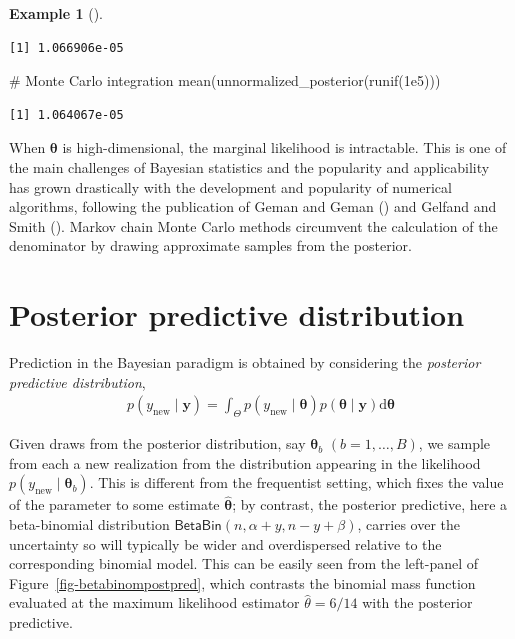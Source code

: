 \documentclass[
  11pt,
  letterpaper,
]{scrbook}
\newenvironment{Shaded}{\begin{snugshade}}{\end{snugshade}}
\newcommand{\CommentTok}[1]{\textcolor[rgb]{0.37,0.37,0.37}{#1}}
\newcommand{\FloatTok}[1]{\textcolor[rgb]{0.68,0.00,0.00}{#1}}
\newcommand{\FunctionTok}[1]{\textcolor[rgb]{0.28,0.35,0.67}{#1}}
\newcommand{\NormalTok}[1]{\textcolor[rgb]{0.00,0.23,0.31}{#1}}
\theoremstyle{definition}
\theoremstyle{definition}
\newtheorem{example}{Example}[chapter]
\theoremstyle{definition}
\theoremstyle{plain}
\theoremstyle{plain}
\theoremstyle{remark}
\begin{document}
\begin{example}[]
\begin{verbatim}
[1] 1.066906e-05
\end{verbatim}

\begin{Shaded}
\begin{Highlighting}[]
\CommentTok{\# Monte Carlo integration}
\FunctionTok{mean}\NormalTok{(}\FunctionTok{unnormalized\_posterior}\NormalTok{(}\FunctionTok{runif}\NormalTok{(}\FloatTok{1e5}\NormalTok{)))}
\end{Highlighting}
\end{Shaded}

\begin{verbatim}
[1] 1.064067e-05
\end{verbatim}

\end{example}

When \(\boldsymbol{\theta}\) is high-dimensional, the marginal
likelihood is intractable. This is one of the main challenges of
Bayesian statistics and the popularity and applicability has grown
drastically with the development and popularity of numerical algorithms,
following the publication of Geman and Geman
() and Gelfand and Smith
(). Markov chain Monte Carlo
methods circumvent the calculation of the denominator by drawing
approximate samples from the posterior.

\section{Posterior predictive
distribution}\label{posterior-predictive-distribution}

Prediction in the Bayesian paradigm is obtained by considering the
\emph{posterior predictive distribution}, \begin{align*}
p(y_{\text{new}} \mid \boldsymbol{y}) =
\int_{\Theta} p(y_{\text{new}}  \mid \boldsymbol{\theta}) p(\boldsymbol{\theta} \mid  \boldsymbol{y}) \mathrm{d} \boldsymbol{\theta}
\end{align*}

Given draws from the posterior distribution, say
\(\boldsymbol{\theta}_b\) \((b=1, \ldots, B)\), we sample from each a
new realization from the distribution appearing in the likelihood
\(p(y_{\text{new}}  \mid \boldsymbol{\theta}_b)\). This is different
from the frequentist setting, which fixes the value of the parameter to
some estimate \(\widehat{\boldsymbol{\theta}}\); by contrast, the
posterior predictive, here a beta-binomial distribution
\(\mathsf{BetaBin}(n, \alpha + y, n - y + \beta)\), carries over the
uncertainty so will typically be wider and overdispersed relative to the
corresponding binomial model. This can be easily seen from the
left-panel of Figure~\ref{fig-betabinompostpred}, which contrasts the
binomial mass function evaluated at the maximum likelihood estimator
\(\widehat{\theta}=6/14\) with the posterior predictive.
\end{document}
